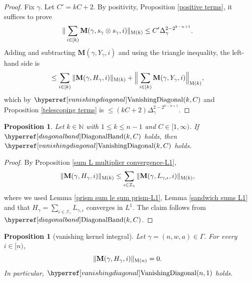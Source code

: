 \documentclass[12pt,reqno]{amsart}
\theoremstyle{plain}
\newtheorem{proposition}[theorem]{Proposition}
\numberwithin{equation}{section}
\theoremstyle{remark}
\newcommand{\uses}[1]{}
\newcommand{\usesdefs}[1]{}
\newcommand{\N}{{\mathbb N}}
\newcommand{\M}{\mathbf{M}}
\begin{document}
\begin{proof}
Fix $\gamma$. Let $C'=kC+2$.
By  positivity, Proposition \ref{positive terms}, it suffices to prove
\begin{equation}
    \|\sum_{i\in [k)} \M(\gamma,s_\gamma \otimes s_\gamma,i)\|_{{\rm M}(k)}\le C' \Delta_\gamma^{2-2^{k-n+1}}.
\end{equation}
Adding and subtracting $\M(\gamma, Y_\gamma, i)$ and using the triangle inequality, the left-hand side is
\[
\le \sum_{i\in [k)} \|\M(\gamma, H_\gamma,i)\|_{{\rm M}(k)} + \Big\|\sum_{i\in [k)} \M(\gamma, Y_\gamma,i)\Big\|_{{\rm M}(k)},
\]
which by $\VanishingDiagonal{k,C}$ and Proposition \ref{telescoping terms} is
$\le (kC+2) \Delta_\gamma^{2-2^{k-n+1}}$.
\end{proof}

\begin{proposition}
\label{diagonal band implies vanishing diagonal}\uses{sum L multiplier convergence-L1,prism sum le sum prism-L1,sandwich sums L1}\usesdefs{kernel sequences,sandwich kernel,H multiplier,L multiplier,summation-definition,vanishing diagonal,diagonal band}
Let $k\in\N$ with $1\le k\le n-1$ and $C\in [1,\infty)$.
If $\DiagonalBand{k,C}$ holds, then $\VanishingDiagonal{k,C}$ holds.
\end{proposition}

\begin{proof}
By Proposition \ref{sum L multiplier convergence-L1},
\[ \|\M(\gamma,H_\gamma,i)\|_{{\rm M}(k)} \le \sum_{\iota \in \mathcal{I}_{\gamma}} \|\M(\gamma,L_{\gamma,\iota},i)\|_{{\rm M}(k)}, \]
where we used Lemma \ref{prism sum le sum prism-L1}, Lemma \ref{sandwich sums L1} and that $H_\gamma=\sum_{\iota\in \mathcal{I}_{\gamma}} L_{\gamma,\iota}$ converges in $L^1$.
The claim follows from $\DiagonalBand{k,C}$.
\end{proof}

\begin{proposition}[vanishing kernel integral]\label{vanishing kernel integral}\uses{simplification 1 prism,H vanishing integral,M to K}\usesdefs{geometric parameters,kernel sequences,sandwich kernel,H multiplier,vanishing diagonal}
Let $\gamma=(n,w,a)\in \Gamma$.
For every $i\in [n)$,
\begin{equation}\label{auto:terminal-H-prism-form-zero}
    \|\M(\gamma,H_\gamma,i)\|_{{\rm M}(n)}=0.
\end{equation}
In particular, $\VanishingDiagonal{n,1}$ holds.
\end{proposition}
\end{document}
